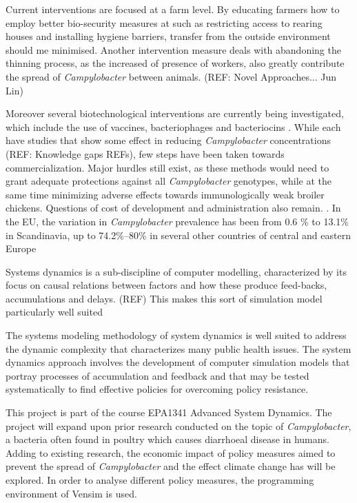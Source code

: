 Current interventions are focused at a farm level. By educating farmers how to employ better bio-security measures at such as restricting access to rearing houses and installing hygiene barriers, transfer from the outside environment should me minimised. Another intervention measure deals with abandoning the thinning process, as the increased of presence of workers, also greatly contribute the spread of \textit{Campylobacter} between animals. (REF: Novel Approaches... Jun Lin) 

Moreover several biotechnological interventions are currently being investigated, which include the use of vaccines, bacteriophages and bacteriocins \parencite{hansson_knowledge_2018}. While each have studies that show some effect in reducing \textit{Campylobacter} concentrations (REF: Knowledge gaps REFs), few steps have been taken towards commercialization. Major hurdles still exist, as these methods would need to grant adequate protections against all \textit{Campylobacter} genotypes, while at the same time minimizing adverse effects towards immunologically weak broiler chickens. Questions of cost of development and administration also remain. \parencite{hansson_knowledge_2018}.
        In the EU, the variation in \textit{Campylobacter} prevalence has been from 0.6 \% to 13.1\% in Scandinavia, up to 74.2\%–80\% in several other countries of central and eastern Europe \cite{skarp_campylobacteriosis_2015} 



Systems dynamics is a sub-discipline of computer modelling, characterized by its focus on causal relations between factors and how these produce feed-backs, accumulations and delays. (REF) This makes this sort of simulation model particularly well suited 

The systems modeling methodology of system dynamics is well suited to address the dynamic complexity that characterizes many public health issues. The system dynamics approach involves the development of computer simulation models that portray processes of accumulation and feedback and that may be tested systematically to find effective policies for overcoming policy resistance.









This project is part of the course EPA1341 Advanced System Dynamics. The project will expand upon prior research conducted on the topic of \textit{Campylobacter}, a bacteria often found in poultry which causes diarrhoeal disease in humans. Adding to existing research, the economic impact of policy measures aimed to prevent the spread of  \textit{Campylobacter} and the effect climate change has will be explored. In order to analyse different policy measures, the programming environment of Vensim is used. 

